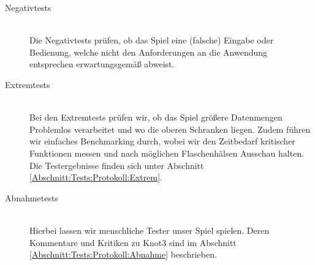 \begin{description}
	\item[Negativtests] \hfill
	\\
	
	Die Negativtests prüfen, ob das Spiel eine (falsche) Eingabe oder Bedienung, welche nicht den Anforderungen an die Anwendung entsprechen erwartungsgemäß abweist. \\
	
\clearpage
	
	
	\item[Extremtests] \hfill
	\\
	
	Bei den Extremtests prüfen wir, ob das Spiel  größere Datenmengen Problemlos verarbeitet und wo die oberen Schranken liegen. Zudem führen wir einfaches Benchmarking durch, wobei wir den Zeitbedarf kritischer Funktionen messen und nach möglichen Flaschenhälsen Ausschau halten. Die Testergebnisse finden sich unter Abschnitt \ref{Abschnitt:Tests:Protokoll:Extrem}.\\


	\item[Abnahmetests] \hfill
	\\
	
	Hierbei lassen wir menschliche Tester unser Spiel spielen. Deren Kommentare und Kritiken zu Knot3 sind im Abschnitt \ref{Abschnitt:Tests:Protokoll:Abnahme} beschrieben.\\
		
\end{description}







